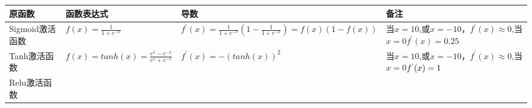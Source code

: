 \begin{longtable}[]{ llll }
\toprule
\begin{minipage}[b]{0.08\columnwidth}\raggedright\strut
原函数\strut
\end{minipage} & \begin{minipage}[b]{0.22\columnwidth}\raggedright\strut
函数表达式\strut
\end{minipage} & \begin{minipage}[b]{0.30\columnwidth}\raggedright\strut
导数\strut
\end{minipage} & \begin{minipage}[b]{0.30\columnwidth}\raggedright\strut
备注\strut
\end{minipage}\tabularnewline
\midrule
\endhead
\begin{minipage}[t]{0.08\columnwidth}\raggedright\strut
Sigmoid激活函数\strut
\end{minipage} & \begin{minipage}[t]{0.22\columnwidth}\raggedright\strut
\(f(x)=\frac{1}{1+e^{-x}}\)\strut
\end{minipage} & \begin{minipage}[t]{0.30\columnwidth}\raggedright\strut
\(f^{'}(x)=\frac{1}{1+e^{-x}}\left( 1- \frac{1}{1+e^{-x}} \right)=f(x)(1-f(x))\)\strut
\end{minipage} & \begin{minipage}[t]{0.30\columnwidth}\raggedright\strut
当\(x=10\),或\(x=-10​\)，\(f^{'}(x) \approx0​\),当\(x=0​\)\(f^{'}(x) =0.25​\)\strut
\end{minipage}\tabularnewline
\begin{minipage}[t]{0.08\columnwidth}\raggedright\strut
Tanh激活函数\strut
\end{minipage} & \begin{minipage}[t]{0.22\columnwidth}\raggedright\strut
\(f(x)=tanh(x)=\frac{e^x-e^{-x}}{e^x+e^{-x}}\)\strut
\end{minipage} & \begin{minipage}[t]{0.30\columnwidth}\raggedright\strut
\(f^{'}(x)=-(tanh(x))^2\)\strut
\end{minipage} & \begin{minipage}[t]{0.30\columnwidth}\raggedright\strut
当\(x=10\),或\(x=-10\)，\(f^{'}(x) \approx0\),当\(x=0\)\(f^{`}(x) =1\)\strut
\end{minipage}\tabularnewline
\begin{minipage}[t]{0.08\columnwidth}\raggedright\strut
Relu激活函数\strut
\end{minipage} & \begin{minipage}[t]{0.22\columnwidth}\raggedright\strut

\end{minipage}
\end{longtable}
